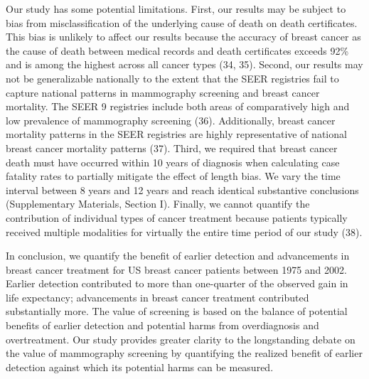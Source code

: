 \documentclass[11pt,letterpaper]{article}
\theoremstyle{plain}
\theoremstyle{remark}
\numberwithin{equation}{section}
\begin{document}
Our study has some potential limitations.  First, our results may be
subject to bias from misclassification of the underlying cause of
death on death certificates. This bias is unlikely to affect our
results because the accuracy of breast cancer as the cause of death
between medical records and death certificates exceeds 92\% and is
among the highest across all cancer types (34, 35).  Second, our
results may not be generalizable nationally to the extent that the
SEER registries fail to capture national patterns in mammography
screening and breast cancer mortality.  The SEER 9 registries include
both areas of comparatively high and low prevalence of mammography
screening (36).  Additionally, breast cancer mortality patterns in the
SEER registries are highly representative of national breast cancer
mortality patterns (37).  Third, we required that breast cancer death
must have occurred within 10 years of diagnosis when calculating case
fatality rates to partially mitigate the effect of length bias.  We
vary the time interval between 8 years and 12 years and reach
identical substantive conclusions (Supplementary Materials, Section
I).  Finally, we cannot quantify the contribution of individual types
of cancer treatment because patients typically received multiple
modalities for virtually the entire time period of our study (38).

In conclusion, we quantify the benefit of earlier detection and
advancements in breast cancer treatment for US breast cancer patients
between 1975 and 2002.  Earlier detection contributed to more than
one-quarter of the observed gain in life expectancy; advancements in
breast cancer treatment contributed substantially more.  The value of
screening is based on the balance of potential benefits of earlier
detection and potential harms from overdiagnosis and overtreatment.
Our study provides greater clarity to the longstanding debate on the
value of mammography screening by quantifying the realized benefit of
earlier detection against which its potential harms can be measured.

\newpage
\end{document}
